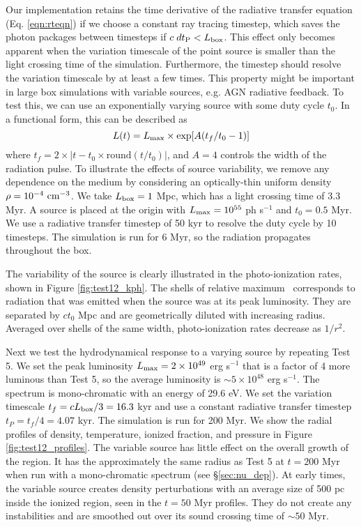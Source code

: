 \documentclass[useAMS,usenatbib]{mn2e}
\begin{document}
Our implementation retains the time derivative of the radiative
transfer equation (Eq. \ref{eqn:rteqn}) if we choose a constant ray
tracing timestep, which saves the photon packages between timesteps if
$c\;dt_{\rm P} < L_{\rm box}$.  This effect only becomes apparent when
the variation timescale of the point source is smaller than the light
crossing time of the simulation.  Furthermore, the timestep should
resolve the variation timescale by at least a few times.  This
property might be important in large box simulations with variable
sources, e.g. AGN radiative feedback.  To test this, we can use an
exponentially varying source with some duty cycle $t_0$.  In a
functional form, this can be described as
%
\begin{equation}
  \label{eqn:test12}
  L(t) = L_{\rm max} \times \exp[A(t_f/t_0 - 1)]
\end{equation}
%
where $t_f = 2 \times |t - t_0 \times \mathrm{round}(t/t_0)|$, and
$A=4$ controls the width of the radiation pulse.  To illustrate the
effects of source variability, we remove any dependence on the medium
by considering an optically-thin uniform density $\rho =
10^{-4}~\cubecm$.  We take $L_{\rm box} = 1$ Mpc, which has a light
crossing time of 3.3 Myr.  A source is placed at the origin with
$L_{\rm max} = 10^{55}$ ph s$^{-1}$ and $t_0 = 0.5$ Myr.  We use a
radiative transfer timestep of 50 kyr to resolve the duty cycle by 10
timesteps.  The simulation is run for 6 Myr, so the radiation
propagates throughout the box.

The variability of the source is clearly illustrated in the
photo-ionization rates, shown in Figure \ref{fig:test12_kph}.  The
shells of relative maximum \kph~corresponds to radiation that was
emitted when the source was at its peak luminosity.  They are
separated by $ct_0$ Mpc and are geometrically diluted with increasing
radius.  Averaged over shells of the same width, photo-ionization
rates decrease as $1/r^2$.

Next we test the hydrodynamical response to a varying source by
repeating Test 5.  We set the peak luminosity $L_{\rm max} = 2 \times
10^{49}$ erg s$^{-1}$ that is a factor of 4 more luminous than Test 5,
so the average luminosity is $\sim 5 \times 10^{48}$ erg s$^{-1}$.
The spectrum is mono-chromatic with an energy of 29.6 eV.  We set the
variation timescale $t_f = cL_{\rm box}/3 = 16.3$ kyr and use a
constant radiative transfer timestep $t_P = t_f/4 = 4.07$ kyr.  The
simulation is run for 200 Myr.  We show the radial profiles of
density, temperature, ionized fraction, and pressure in Figure
\ref{fig:test12_profiles}.  The variable source has little effect on
the overall growth of the \hii region.  It has the approximately
the same radius as Test 5 at $t = 200$ Myr when run with a
mono-chromatic spectrum (see \S\ref{sec:nu_dep}).  At early times, the
variable source creates density perturbations with an average size of
500 pc inside the ionized region, seen in the $t = 50$ Myr profiles.
They do not create any instabilities and are smoothed out over its
sound crossing time of $\sim 50$ Myr.
\end{document}
